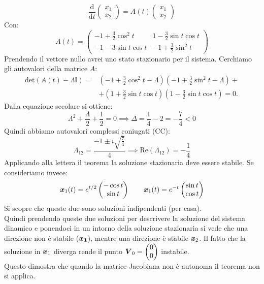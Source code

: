 \begin{exmp}
    \[
	\frac{\text{d} }{\text{d} t} \begin{pmatrix} x_1 \\ x_2 \end{pmatrix} = A(t)\begin{pmatrix} x_1 \\ x_2 \end{pmatrix} 
    \] 
    Con:
    \[
	A(t) = 
	\begin{pmatrix} 
	    -1 + \frac{3}{2}\cos^2t & 1- \frac{3}{2}\sin t\cos t \\
	    -1 -3\sin t \cos t & -1 + \frac{3}{2}\sin^2t
	\end{pmatrix} 
    \] 
    Prendendo il vettore nullo avrei uno stato stazionario per il sistema. Cerchiamo gli autovalori della matrice $A$:
    \[\begin{aligned}
	\text{det}(A(t)- \Lambda  \mathbb{I}) =& (-1 + \frac{3}{2}\cos^2t - \Lambda)(-1+\frac{3}{2}\sin^2t -\Lambda)+\\
					       &+(1+\frac{3}{2}\sin t\cos t)(1-\frac{3}{2}\sin t\cos t)=0
    .\end{aligned}\]
    Dalla equazione secolare si ottiene:
    \[
        \Lambda^2 + \frac{\Lambda}{2}+\frac{1}{2}=0 \implies  \Delta  = \frac{1}{4}-2 = -\frac{7}{4} <0
    \] 
    Quindi abbiamo autovalori complessi coniugati (CC):
    \[
	\Lambda_{12} = \frac{-1 \pm i \sqrt{\frac{7}{4}}}{4} \implies  \text{Re}(\Lambda_{12})=-\frac{1}{4}
    \] 
    Applicando alla lettera il teorema la soluzione stazionaria deve essere stabile. Se consideriamo invece:
    \[
	\boldsymbol{x}_1(t)=e^{t /2}\begin{pmatrix} -\cos t \\ \sin t \end{pmatrix}  \qquad \boldsymbol{x}_1(t)=e^{-t}\begin{pmatrix} \sin t \\ \cos t \end{pmatrix} 
    \] 
    Si scopre che queste due sono soluzioni indipendenti (per casa). \\
    Quindi prendendo queste due soluzioni per descrivere la soluzione del sistema dinamico e ponendoci in un intorno della soluzione stazionaria si vede che una direzione non è stabile ($\boldsymbol{x_1}$), mentre una direzione è stabile $\boldsymbol{x}_2$. Il fatto che la soluzione in $\boldsymbol{x}_1$ diverga rende il punto $\boldsymbol{V}_0 = \begin{pmatrix} 0\\ 0 \end{pmatrix} $ instabile. \\
   Questo dimostra che quando la matrice Jacobiana non è autonoma il teorema non si applica.
\end{exmp}
